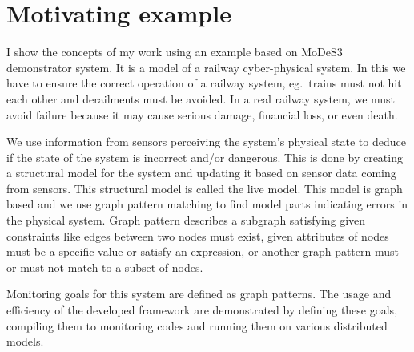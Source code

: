\chapter{Motivating example}


I show the concepts of my work using an example based on MoDeS3~\cite{modes3} demonstrator system. It is a model of a railway cyber-physical system. In this we have to ensure the correct operation of a railway system, eg.\ trains must not hit each other and derailments must be avoided. In a real railway system, we must avoid failure because it may cause serious damage, financial loss, or even death.

We use information from sensors perceiving the system's physical state to deduce if the state of the system is incorrect and/or dangerous. This is done by creating a structural model for the system and updating it based on sensor data coming from sensors. This structural model is called the live model. This model is graph based and we use graph pattern matching to find model parts indicating errors in the physical system. Graph pattern describes a subgraph satisfying given constraints like edges between two nodes must exist, given attributes of nodes must be a specific value or satisfy an expression, or another graph pattern must or must not match to a subset of nodes.

Monitoring goals for this system are defined as graph patterns. The usage and efficiency of the developed framework are demonstrated by defining these goals, compiling them to monitoring codes and running them on various distributed models.

 



